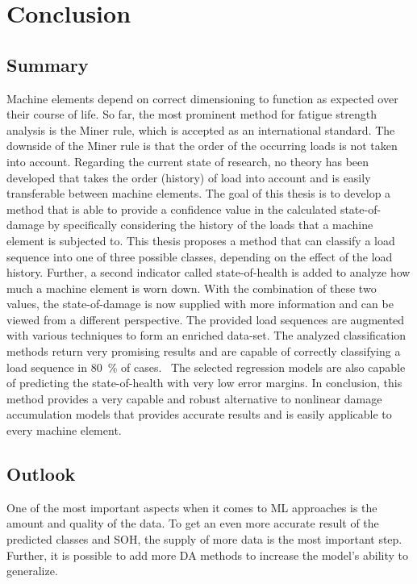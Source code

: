 \chapter{Conclusion}\label{conc}
\section{Summary}
Machine elements depend on correct dimensioning to function as expected over their course of life. So far, the most prominent method for fatigue strength analysis is the Miner rule, which is accepted as an international standard. The downside of the Miner rule is that the order of the occurring loads is not taken into account. Regarding the current state of research, no theory has been developed that takes the order (history) of load into account and is easily transferable between machine elements.
The goal of this thesis is to develop a method that is able to provide a confidence value in the calculated state-of-damage by specifically considering the history of the loads that a machine element is subjected to. This thesis proposes a method that can classify a load sequence into one of three possible classes, depending on the effect of the load history. Further, a second indicator called state-of-health is added to analyze how much a machine element is worn down. With the combination of these two values, the state-of-damage is now supplied with more information and can be viewed from a different perspective. 
The provided load sequences are augmented with various techniques to form an enriched data-set. The analyzed classification methods return very promising results and are capable of correctly classifying a load sequence in 80~\% of cases. 
The selected regression models are also capable of predicting the state-of-health with very low error margins.
In conclusion, this method provides a very capable and robust alternative to nonlinear damage accumulation models that provides accurate results and is easily applicable to every machine element.  


\section{Outlook}
One of the most important aspects when it comes to ML approaches is the amount and quality of the data. To get an even more accurate result of the predicted classes and SOH, the supply of more data is the most important step. Further, it is possible to add more DA methods to increase the model's ability to generalize. 

